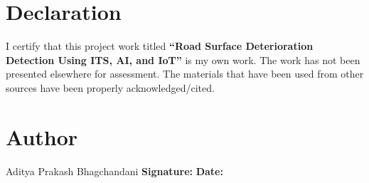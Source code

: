 \newpage
\section*{Declaration}
I certify that this project work titled \newline\textbf{\textquotedblleft Road Surface Deterioration Detection Using ITS, AI, and IoT\textquotedblright} is my own work. The work has not been presented elsewhere for assessment. The materials that have been used from other sources have been properly acknowledged/cited.
\vspace{2cm}
\section*{Author}
Aditya Prakash Bhagchandani
\vspace{1cm}
\newline
\textbf{Signature:}
\vspace{1cm}
\newline
\textbf{Date:}
